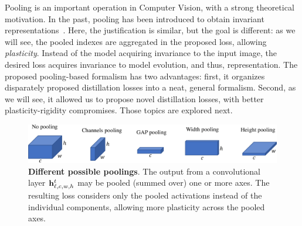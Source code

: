 Pooling is an important operation in Computer Vision, with a strong theoretical motivation. In the
past, pooling has been introduced to obtain invariant
representations~\citep{lowe1999sift,lazbnik2006spatial_pyramid_matching}. Here, the justification is
similar, but the goal is different: as we will see, the pooled indexes are aggregated in the
proposed loss, allowing \textit{plasticity}. Instead of the model acquiring invariance to the input
image, the desired loss acquires invariance to model evolution, and thus, representation.
%
The proposed pooling-based formalism has two advantages: first, it organizes disparately proposed
distillation losses into a neat, general formalism. Second, as we will see, it allowed us to propose
novel distillation losses, with better plasticity-rigidity compromises. Those topics are explored
next.

\begin{figure}[tb]
    \begin{center}
        \includegraphics[width=0.90\linewidth]{images/podnet/pooling}
    \end{center}
    \caption{\textbf{Different possible poolings}. The output from a convolutional layer
        $\mathbf{h}^{t}_{\ell,c,w,h}$ may be pooled (summed over) one or more axes. The resulting loss
        considers only the pooled activations instead of the individual components, allowing more
        plasticity across the pooled axes.}
    \label{fig:pooling}
\end{figure}

